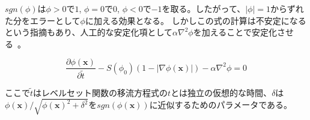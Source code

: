 $sgn(\phi)$は$\phi>0$で$1$, $\phi=0$で$0$, $\phi<0$で$-1$を取る。したがって、$|\phi|=1$からずれた分をエラーとして$\phi$に加える効果となる。
しかしこの式の計算は不安定になるという指摘もあり、人工的な安定化項として$\alpha \nabla^2 \phi$を加えることで安定化させる~\cite{Pimenta2018}。

\begin{equation}
\label{levelset-reinitialization}
	\frac{\partial \phi (\bm{x})}{\partial \tilde{t}}
	- S(\phi_{0})(1 - |\nabla \phi (\bm{x})|) 
	- \alpha \nabla^2 \phi = 0
\end{equation}

ここで$\tilde{t}$はレベルセット関数の移流方程式の$t$とは独立の仮想的な時間、$\delta$は$\phi(\bm{x})/\sqrt{\phi(\bm{x})^2+\delta^2}$を$sgn(\phi(\bm{x}))$に近似するためのパラメータである。

\begin{comment}
\subsubsection{保存型レベルセット関数の再初期化}
Olssonらによって提案されたConservative Levelset Method(CLSM)\cite{Olsson2005}, \cite{Olsson2007}。
有限要素法に基づいた定式化までされている文献\cite{Pimenta2018}。
保存型レベルセット関数は界面が厚い場合、界面の余計な動きが生じる。\cite{Takeuchi2018}
CLS関数は$\epsilon$が0に近づく極限ではVOF関数Cに一致する。\cite{Nakazawa2023}

CLSMでは符号付距離関数を正規化されたヘビサイド関数とすることで保存性の問題を解決する
\begin{equation}
\label{CLSM-heaviside}
	\phi(\bm{x}) = \frac{1}{1+e^{d(\bm{x})/\epsilon}}
\end{equation}
ここで$d(\bm{x})$は符号付距離関数、$\epsilon$は振動を回避するためにスムージングする半径、インターフェース厚さとも呼ばれる。

以下の式を解くことでヘビサイド関数の性質を保たせる。\cite{Olsson2007}
\begin{equation}
\label{CLSM-reinitialization}
	\frac{\partial \phi}{\partial \tau} + \nabla \cdot [\phi(1-\phi)\bm{n}_{\Gamma}] = \epsilon \nabla \cdot [\bm{n}_{\Gamma}(\nabla \phi \cdot \bm{n}_{\Gamma})]
\end{equation}
ここで$\bm{n}_{\Gamma}$はインターフェース$\Gamma$における単位法線ベクトルで、重要なのはこれは再初期化の間で変わらない。
\begin{equation}
\label{CLSM-n}
	\bm{n}_{\Gamma} = \frac{\nabla \phi (\bm{x}, \tau_0)}{|\nabla \phi (\bm{x}, \tau_0)|}
\end{equation}


\end{comment}
